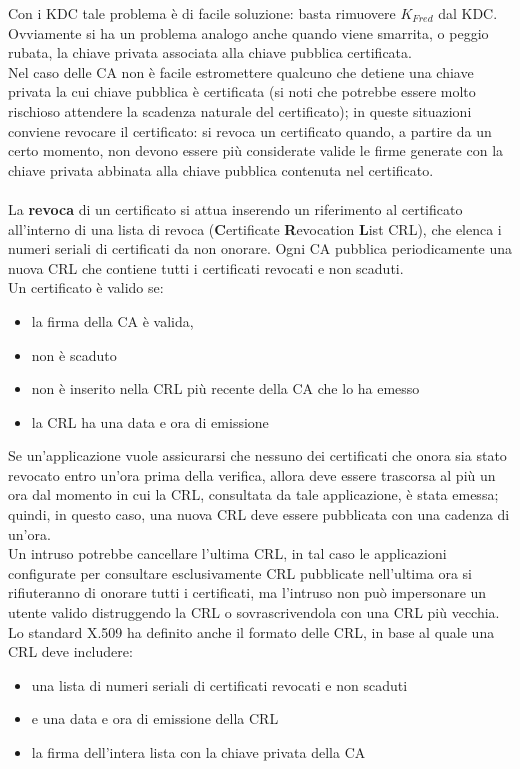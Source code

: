Con i KDC tale problema è di facile soluzione: basta rimuovere $K_{Fred}$ dal KDC.\\ 
Ovviamente si ha un problema analogo anche quando viene smarrita, o peggio rubata, la chiave privata associata alla chiave pubblica certificata.\\
Nel caso delle CA non è facile estromettere qualcuno che detiene una chiave privata la cui chiave pubblica è certificata (si noti che potrebbe essere molto rischioso attendere la scadenza naturale del certificato); in queste situazioni conviene revocare il certificato: si revoca un certificato quando, a partire da un certo momento, non devono essere più considerate valide le firme generate con la chiave privata abbinata alla chiave pubblica contenuta nel certificato. \\ \\
La \textbf{revoca} di un certificato si attua inserendo un riferimento al certificato all'interno di una lista di revoca (\textbf{C}ertificate \textbf{R}evocation \textbf{L}ist CRL), che elenca i numeri seriali di certificati da non onorare. Ogni CA pubblica periodicamente una nuova CRL che contiene tutti i certificati revocati e non scaduti.\\
Un certificato è valido se:
\begin{itemize}
\item la firma della CA è valida,
\item non è scaduto
\item non è inserito nella CRL più recente della CA che lo ha emesso
\item la CRL ha una data e ora di emissione
\end{itemize}
Se un'applicazione vuole assicurarsi che nessuno dei certificati che onora sia stato revocato entro un'ora prima
della verifica, allora deve essere trascorsa al più un ora dal momento in cui la CRL, consultata da tale applicazione, è stata emessa; quindi, in questo caso, una nuova CRL deve essere pubblicata con una cadenza di un'ora.\\
Un intruso potrebbe cancellare l'ultima CRL, in tal caso le applicazioni configurate per consultare esclusivamente CRL pubblicate nell'ultima ora si rifiuteranno di onorare tutti i certificati, ma l'intruso non può impersonare un utente valido distruggendo la CRL o sovrascrivendola con una CRL più vecchia.\\
Lo standard X.509 ha definito anche il formato delle CRL, in base al quale una CRL deve includere:
\begin{itemize}
\item una lista di numeri seriali di certificati revocati e non scaduti
\item e una data e ora di emissione della CRL
\item la firma dell'intera lista con la chiave privata della CA
\end{itemize}
